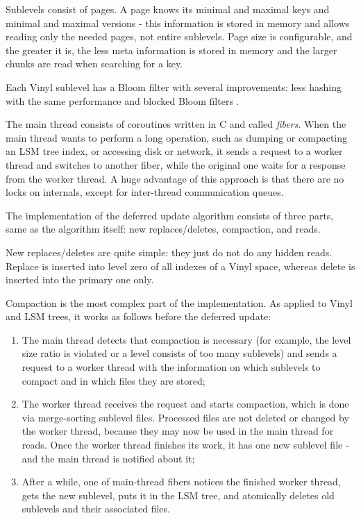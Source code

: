 \documentclass{vldb}
\begin{document}
Sublevels consist of pages. A page knows its minimal and maximal keys and minimal
and maximal versions - this information is stored in memory and allows reading
only the needed pages, not entire sublevels. Page size is configurable, and the
greater it is, the less meta information is stored in memory and the larger chunks are
read when searching for a key.

Each Vinyl sublevel has a Bloom filter with several improvements: less hashing
with the same performance \cite{Kirsch:bloom_less_hashing} and blocked Bloom
filters \cite{Putze:bloom_cache_oblivious}.

The main thread consists of coroutines written in C and called \textit{fibers}. When
the main thread wants to perform a long operation, such as dumping or compacting
an LSM tree index, or accessing disk or network, it sends a request to a worker
thread and switches to another fiber, while the original one waits for a response
from the worker thread. A huge advantage of this approach is that there are no locks
on internals, except for inter-thread communication queues.

The implementation of the deferred update algorithm consists of three parts, same as the
algorithm itself: new replaces/deletes, compaction, and reads.

New replaces/deletes are quite simple: they just do not do any hidden reads. Replace is
inserted into level zero of all indexes of a Vinyl space, whereas delete is inserted into the
primary one only.

Compaction is the most complex part of the implementation. As applied to
Vinyl and LSM trees, it works as follows before the deferred update:
\begin{enumerate}
\item The main thread detects that compaction is necessary (for example, the level
size ratio is violated or a level consists of too many sublevels) and sends a
request to a worker thread with the information on which sublevels to compact and in
which files they are stored;
\item The worker thread receives the request and starts compaction, which is done
via merge-sorting sublevel files. Processed files are not deleted or changed
by the worker thread, because they may now be used in the main thread for reads.
Once the worker thread finishes its work, it has one new sublevel file - and the main
thread is notified about it;
\item After a while, one of main-thread fibers notices the finished worker thread,
gets the new sublevel, puts it in the LSM tree, and atomically deletes old sublevels and
their associated files.
\end{enumerate}
\end{document}
